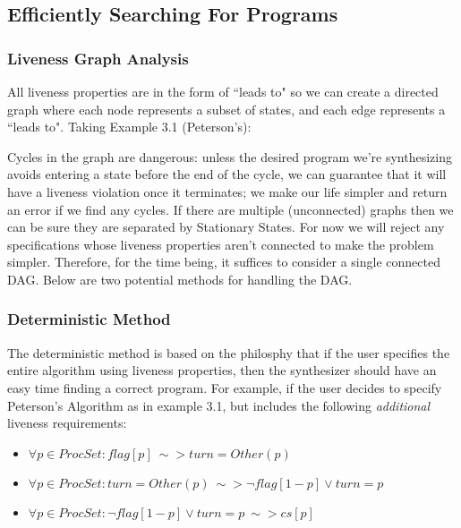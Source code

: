 \documentclass[12pt]{article}
\begin{document}
\subsection{Efficiently Searching For Programs}
\subsubsection{Liveness Graph Analysis}
All liveness properties are in the form of ``leads to" so we can create a directed graph where each node represents a subset of states, and each edge represents a ``leads to".  Taking Example 3.1 (Peterson's):

\begin{center}
\end{center}

Cycles in the graph are dangerous: unless the desired program we're synthesizing avoids entering a state before the end of the cycle, we can guarantee that it will have a liveness violation once it terminates; we make our life simpler and return an error if we find any cycles.  If there are multiple (unconnected) graphs then we can be sure they are separated by Stationary States.  For now we will reject any specifications whose liveness properties aren't connected to make the problem simpler.  Therefore, for the time being, it suffices to consider a single connected DAG.  Below are two potential methods for handling the DAG.  

\subsubsection{Deterministic Method}
The deterministic method is based on the philosphy that if the user specifies the entire algorithm using liveness properties, then the synthesizer should have an easy time finding a correct program.  For example, if the user decides to specify Peterson's Algorithm as in example 3.1, but includes the following \textit{additional} liveness requirements:
\begin{itemize}
	\item $\forall p \in ProcSet : flag[p] ~\sim> turn = Other(p)$
	\item $\forall p \in ProcSet : turn = Other(p) ~\sim> \lnot flag[1-p] \vee turn = p$
	\item $\forall p \in ProcSet : \lnot flag[1-p] \vee turn = p ~\sim> cs[p]$
\end{itemize}
\end{document}
